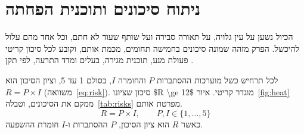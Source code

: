 \chapter{ניתוח סיכונים ותוכנית הפחתה}
\label{ch:risk}

\begin{managerbox}
הכיול נשען על עין גלויה, על תאורה סבירה ועל שותף שעוד לא חתם, וכל אחד מהם עלול להיכשל. הפרק מזהה שמונה סיכונים בחמישה תחומים, מכמת אותם, וקובע לכל סיכון קריטי פעולת מנע, תוכנית מגירה, בעלים ומדד התרעה, לפי תקן  \cite{iso31000}.
\end{managerbox}

לכל תרחיש כשל מוערכות ההסתברות $P$ והחומרה $I$, בסולם \num{1} עד \num{5}, וציון הסיכון הוא $R = P \times I$ (משוואה~\ref{eq:risk}). סיכון שציונו \num{$R \ge 12$} מוגדר קריטי. איור~\ref{fig:heat} ממקם את הסיכונים, וטבלה~\ref{tab:risks} מפרטת אותם.
\begin{equation}
R = P \times I, \qquad P, I \in \{1,\dots,5\}
\label{eq:risk}
\end{equation}
כאשר $R$ הוא ציון הסיכון, $P$ ההסתברות ו-$I$ חומרת ההשפעה.

